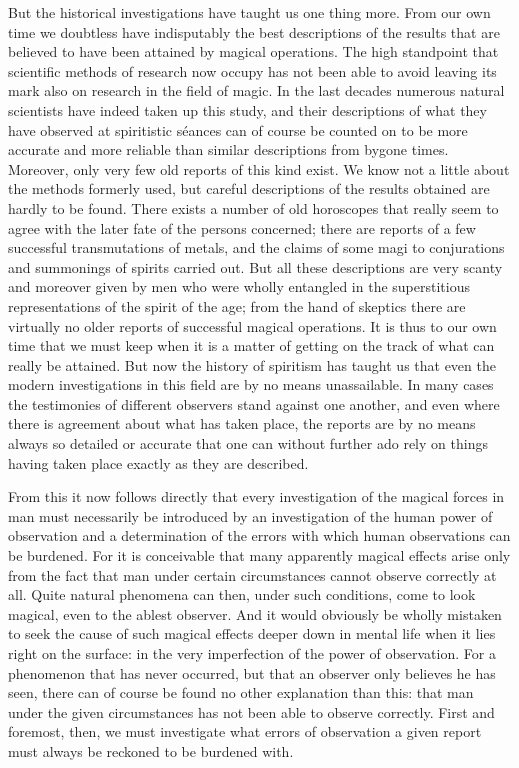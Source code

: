 \documentclass[12pt,a4paper,openany]{book}
\newcommand{\opage}[1]{\marginnote{\footnotesize\textit{[#1]}}}
\begin{document}
But the historical investigations have taught us one thing more.
From our own time we doubtless have indisputably the best descriptions
of the results that are believed to have been attained by magical
operations. The high standpoint that scientific methods
of research now occupy has not been able to avoid
leaving its mark also on research in the field of magic. In the
last decades numerous natural scientists have indeed taken up
this study, and their descriptions of what they have
observed at spiritistic séances can of course be counted on
to be more accurate and more reliable than similar descriptions
from bygone times. Moreover, only very few
old reports of this kind exist. We know not a little about the
methods formerly used, but careful descriptions
of the results obtained are hardly to be found. There exists
a number of old horoscopes that really seem to agree with
the later fate of the persons concerned; there are reports
of a few successful transmutations of metals, and the claims of some
magi to conjurations and summonings of spirits carried out.
But all these descriptions are very scanty and
moreover given by men who were wholly entangled in the superstitious
representations of the spirit of the age; from the hand of skeptics there are
virtually no older reports of successful magical
operations. It is thus to our own time that we must
keep when it is a matter of getting on the track of what
can really be attained. But now the history of spiritism has
taught us that even the modern investigations in this field
are by no means unassailable. In many cases the testimonies of
different observers stand against one another, and even
where there is agreement about what has taken place, the reports
are by no means always so detailed or accurate that
\setcounter{footnote}{0}%
\opage{288}one can without further ado rely on things having taken place
exactly as they are described.

From this it now follows directly that every investigation of the
magical forces in man must necessarily be introduced by
an investigation of the human power of observation and
a determination of the errors with which human observations
can be burdened. For it is conceivable that
many apparently magical effects arise only from the fact
that man under certain circumstances cannot observe
correctly at all. Quite natural phenomena can then, under
such conditions, come to look magical, even
to the ablest observer. And it would obviously be wholly
mistaken to seek the cause of such magical effects deeper
down in mental life when it lies right on the surface: in the very
imperfection of the power of observation. For a phenomenon that
has never occurred, but that an observer only believes he has
seen, there can of course be found no other explanation than this:
that man under the given circumstances has not been able to
observe correctly. First and foremost, then, we must investigate
what errors of observation a given report must always
be reckoned to be burdened with.
\end{document}
